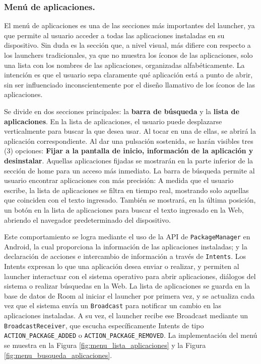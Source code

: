\subsubsection{Menú de aplicaciones.}

El menú de aplicaciones es una de las secciones más importantes del launcher, ya que permite al usuario acceder a todas las aplicaciones instaladas en su dispositivo. Sin duda es la sección que, a nivel visual, más difiere con respecto a los launchers tradicionales, ya que no muestra los íconos de las aplicaciones, solo una lista con los nombres de las aplicaciones, organizadas alfabéticamente. La intención es que el usuario sepa claramente qué aplicación está a punto de abrir, sin ser influenciado inconscientemente por el diseño llamativo de los íconos de las aplicaciones. 

Se divide en dos secciones principales: la \textbf{barra de búsqueda} y la \textbf{lista de aplicaciones}. En la lista de aplicaciones, el usuario puede desplazarse verticalmente para buscar la que desea usar. Al tocar en una de ellas, se abrirá la aplicación correspondiente. Al dar una pulsación sostenida, se harán visibles tres (3) opciones: \textbf{Fijar a la pantalla de inicio, información de la aplicación y desinstalar}. Aquellas aplicaciones fijadas se mostrarán en la parte inferior de la sección de home para un acceso más inmediato. La barra de búsqueda permite al usuario encontrar aplicaciones con más precisión: A medida que el usuario escribe, la lista de aplicaciones se filtra en tiempo real, mostrando solo aquellas que coinciden con el texto ingresado. También se mostrará, en la última posición, un botón en la lista de aplicaciones para buscar el texto ingresado en la Web, abriendo el navegador predeterminado del dispositivo.

Este comportamiento se logra mediante el uso de la API de \texttt{PackageManager} en Android, la cual proporciona la información de las aplicaciones instaladas; y la declaración de acciones e intercambio de información a través de \texttt{Intents}. Los Intents expresan lo que una aplicación desea enviar o realizar, y permiten al launcher interactuar con el sistema operativo para abrir aplicaciones, diálogos del sistema o realizar búsquedas en la Web. La lista de aplicaciones se guarda en la base de datos de Room al iniciar el launcher por primera vez, y se actualiza cada vez que el sistema envía un \texttt{Broadcast} para notificar un cambio en las aplicaciones instaladas. A su vez, el launcher recibe ese Broadcast mediante un \texttt{BroadcastReceiver}, que escucha específicamente Intents de tipo \texttt{ACTION\_PACKAGE\_ADDED} o \texttt{ACTION\_PACKAGE\_REMOVED}. La implementación del menú se muestra en la Figura \ref{fig:menu_lista_aplicaciones} y la Figura \ref{fig:menu_busqueda_aplicaciones}.

